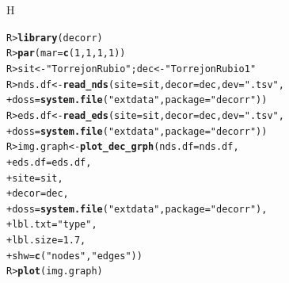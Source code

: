 \documentclass[article]{jss}\usepackage[]{graphicx}\usepackage[]{color}
\makeatletter
\newcommand{\hlnum}[1]{\textcolor[rgb]{0.686,0.059,0.569}{#1}}%
\newcommand{\hlstr}[1]{\textcolor[rgb]{0.192,0.494,0.8}{#1}}%
\newcommand{\hlstd}[1]{\textcolor[rgb]{0.345,0.345,0.345}{#1}}%
\newcommand{\hlkwb}[1]{\textcolor[rgb]{0.69,0.353,0.396}{#1}}%
\newcommand{\hlkwc}[1]{\textcolor[rgb]{0.333,0.667,0.333}{#1}}%
\newcommand{\hlkwd}[1]{\textcolor[rgb]{0.737,0.353,0.396}{\textbf{#1}}}%
\newenvironment{kframe}{%
 \def\at@end@of@kframe{}%
 \ifinner\ifhmode%
  \def\at@end@of@kframe{\end{minipage}}%
  \begin{minipage}{\columnwidth}%
 \fi\fi%
 \def\FrameCommand##1{\hskip\@totalleftmargin \hskip-\fboxsep
 \colorbox{shadecolor}{##1}\hskip-\fboxsep
     \hskip-\linewidth \hskip-\@totalleftmargin \hskip\columnwidth}%
 \MakeFramed {\advance\hsize-\width
   \@totalleftmargin\z@ \linewidth\hsize
   \@setminipage}}%
 {\par\unskip\endMakeFramed%
 \at@end@of@kframe}
\newenvironment{knitrout}{}{} %
\makeatother
\begin{document}
\begin{figure}{H}
\centering
\begin{knitrout}
\color{fgcolor}\begin{kframe}
\begin{alltt}
\hlstd{R> }\hlkwd{library}\hlstd{(decorr)}
\hlstd{R> }\hlkwd{par}\hlstd{(}\hlkwc{mar}\hlstd{=}\hlkwd{c}\hlstd{(}\hlnum{1}\hlstd{,}\hlnum{1}\hlstd{,}\hlnum{1}\hlstd{,}\hlnum{1}\hlstd{) )}
\hlstd{R> }\hlstd{sit} \hlkwb{<-} \hlstr{"Torrejon Rubio"} \hlstd{; dec} \hlkwb{<-} \hlstr{"Torrejon Rubio 1"}
\hlstd{R> }\hlstd{nds.df} \hlkwb{<-} \hlkwd{read_nds}\hlstd{(}\hlkwc{site} \hlstd{= sit,} \hlkwc{decor} \hlstd{= dec,} \hlkwc{dev} \hlstd{=} \hlstr{".tsv"}\hlstd{,}
\hlstd{+ }                   \hlkwc{doss} \hlstd{=} \hlkwd{system.file}\hlstd{(}\hlstr{"extdata"}\hlstd{,} \hlkwc{package} \hlstd{=} \hlstr{"decorr"}\hlstd{))}
\hlstd{R> }\hlstd{eds.df} \hlkwb{<-} \hlkwd{read_eds}\hlstd{(}\hlkwc{site} \hlstd{= sit,} \hlkwc{decor} \hlstd{= dec,} \hlkwc{dev} \hlstd{=} \hlstr{".tsv"}\hlstd{,}
\hlstd{+ }                   \hlkwc{doss} \hlstd{=} \hlkwd{system.file}\hlstd{(}\hlstr{"extdata"}\hlstd{,} \hlkwc{package} \hlstd{=} \hlstr{"decorr"}\hlstd{))}
\hlstd{R> }\hlstd{img.graph} \hlkwb{<-} \hlkwd{plot_dec_grph}\hlstd{(}\hlkwc{nds.df} \hlstd{= nds.df,}
\hlstd{+ }                           \hlkwc{eds.df} \hlstd{= eds.df,}
\hlstd{+ }                           \hlkwc{site} \hlstd{= sit,}
\hlstd{+ }                           \hlkwc{decor} \hlstd{= dec,}
\hlstd{+ }                           \hlkwc{doss} \hlstd{=} \hlkwd{system.file}\hlstd{(}\hlstr{"extdata"}\hlstd{,} \hlkwc{package} \hlstd{=} \hlstr{"decorr"}\hlstd{),}
\hlstd{+ }                           \hlkwc{lbl.txt} \hlstd{=} \hlstr{"type"}\hlstd{,}
\hlstd{+ }                           \hlkwc{lbl.size}\hlstd{=}\hlnum{1.7}\hlstd{,}
\hlstd{+ }                           \hlkwc{shw} \hlstd{=} \hlkwd{c}\hlstd{(}\hlstr{"nodes"}\hlstd{,}\hlstr{"edges"}\hlstd{))}
\hlstd{R> }\hlkwd{plot}\hlstd{(img.graph)}
\end{alltt}
\end{kframe}

\end{knitrout}
\end{figure}
\end{document}

